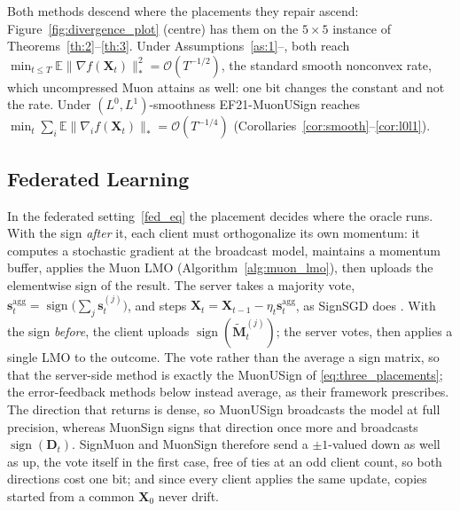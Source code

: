 Both methods descend where the placements they repair ascend: Figure~\ref{fig:divergence_plot} (centre) has them on the $5\times5$ instance of Theorems~\ref{th:2}--\ref{th:3}.  Under Assumptions~\ref{as:1}--, both reach $\min_{t\le T}\mathbb{E}\|\nabla f(\mathbf{X}_t)\|_*^2=\mathcal{O}(T^{-1/2})$, the standard smooth nonconvex rate, which uncompressed Muon attains as well: one bit changes the constant and not the rate. Under $(L^0,L^1)$-smoothness EF21-MuonUSign reaches $\min_t\sum_i\mathbb{E}\|\nabla_i f(\mathbf{X}_t)\|_*=\mathcal{O}(T^{-1/4})$  (Corollaries~\ref{cor:smooth}--\ref{cor:l0l1}).  


\subsection{Federated Learning}
In the federated setting~\eqref{fed_eq} the placement decides where the oracle runs. With the sign \emph{after} it, each client must orthogonalize its own momentum: it computes a stochastic gradient at the broadcast model, maintains a momentum buffer, applies the Muon LMO (Algorithm~\ref{alg:muon_lmo}), then uploads the elementwise sign of the result. The server takes a majority vote, $\mathbf{s}_t^{\mathrm{agg}}=\operatorname{sign}\bigl(\sum_{j} \mathbf{s}_t^{(j)}\bigr)$, and steps $\mathbf{X}_t=\mathbf{X}_{t-1}-\eta_t\mathbf{s}_t^{\mathrm{agg}}$, as SignSGD does \citep{bernstein2019signsgdmajority}. With the sign \emph{before}, the client uploads $\operatorname{sign}(\tilde{\mathbf{M}}_t^{(j)})$; the server votes, then applies a single LMO to the outcome. The vote rather than the average  a sign matrix, so that the server-side method is exactly the MuonUSign of \eqref{eq:three_placements}; the error-feedback methods below instead average, as their framework prescribes. The direction that returns is dense, so MuonUSign broadcasts the model at full precision, whereas MuonSign signs that direction once more and broadcasts $\operatorname{sign}(\mathbf{D}_t)$. SignMuon and MuonSign therefore send a $\pm1$-valued  down as well as up, the vote itself in the first case, free of ties at an odd client count, so both directions cost one bit; and since every client applies the same update, copies started from a common $\mathbf{X}_0$ never drift.

